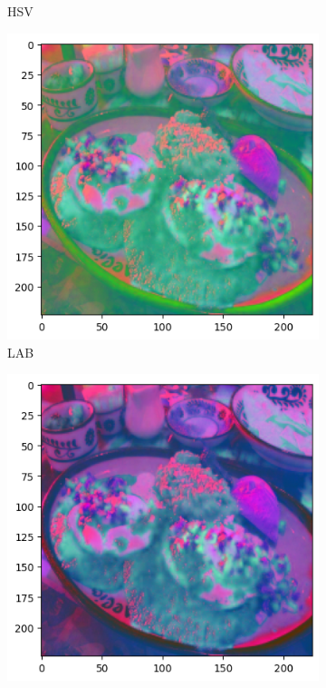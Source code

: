 \begin{figure}[htbp]
\begin{subfigure}[b]{0.22\textwidth}
    \caption{HSV}
    \label{fig:hsv}
  \end{subfigure}
  \hfill
  \begin{subfigure}[b]{0.22\textwidth}
    \includegraphics[width=\textwidth]{graphics/images/colorspaces/lab.png}
    \caption{LAB}
    \label{fig:lab}
  \end{subfigure}
  \hfill
  \begin{subfigure}[b]{0.22\textwidth}
    \includegraphics[width=\textwidth]{graphics/images/colorspaces/luv.png}

\end{subfigure}
\end{figure}
